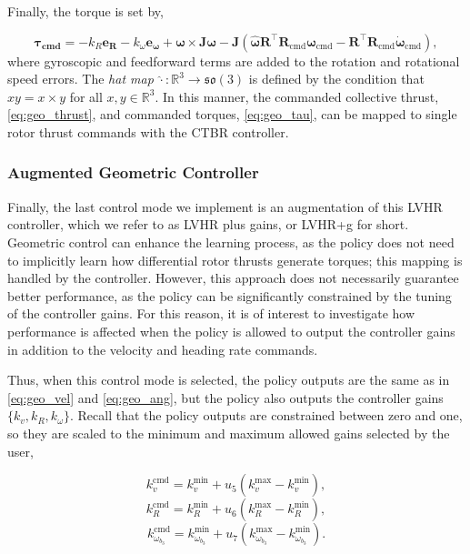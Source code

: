 Finally, the torque is set by,

\begin{equation}\label{eq:geo_tau}
    \boldsymbol{\tau}_\textbf{cmd} = - k_R \mathbf{e}_\textbf{R} - k_\omega \mathbf{e}_{\boldsymbol{\omega}} + \boldsymbol{\omega}  \times \mathbf{J}\boldsymbol{\omega} - \mathbf{J} ( \hat{\boldsymbol{\omega}} \mathbf{R}^\top \mathbf{R}_{\text{cmd}} \boldsymbol{\omega}_{\text{cmd}} - \mathbf{R}^\top \mathbf{R}_{\text{cmd}} \dot{\boldsymbol{\omega}}_{\text{cmd}} ),
\end{equation}
where gyroscopic and feedforward terms are added to the rotation and rotational speed errors.
The \textit{hat map} $\hat{\cdot} \colon \mathbb{R}^3 \to \mathfrak{so}(3)$ is defined by the condition that $\hat{x} y = x \times y$ for all $x, y \in \mathbb{R}^3$.
In this manner, the commanded collective thrust, \eqref{eq:geo_thrust}, and commanded torques, \eqref{eq:geo_tau}, can be mapped to single rotor thrust commands with the \ac{CTBR} controller.


\subsubsection{Augmented Geometric Controller}

Finally, the last control mode we implement is an augmentation of this \ac{LVHR} controller, which we refer to as \ac{LVHR} plus gains, or \ac{LVHR}+g for short.
Geometric control can enhance the learning process, as the policy does not need to implicitly learn how differential rotor thrusts generate torques; this mapping is handled by the controller.
However, this approach does not necessarily guarantee better performance, as the policy can be significantly constrained by the tuning of the controller gains.
For this reason, it is of interest to investigate how performance is affected when the policy is allowed to output the controller gains in addition to the velocity and heading rate commands.

Thus, when this control mode is selected, the policy outputs are the same as in \eqref{eq:geo_vel} and \eqref{eq:geo_ang}, but the policy also outputs the controller gains $\{k_v, k_R, k_\omega\}$. 
Recall that the policy outputs are constrained between zero and one, so they are scaled to the minimum and maximum allowed gains selected by the user,

\begin{equation}
    k_v^{\text{cmd}} = k_v^{\text{min}} + u_5 \left(k_v^{\text{max}} - k_v^{\text{min}}\right),
\end{equation}
\begin{equation}
    k_R^{\text{cmd}} = k_R^{\text{min}} + u_6 \left(k_R^{\text{max}} - k_R^{\text{min}}\right),
\end{equation}
\begin{equation}
    k_{\omega_{b_{3}}}^{\text{cmd}} = k_{\omega_{b_{3}}}^{\text{min}} + u_7 \left(k_{\omega_{b_{3}}}^{\text{max}} - k_{\omega_{b_{3}}}^{\text{min}}\right).
\end{equation}


